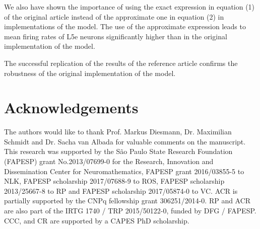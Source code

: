 \documentclass[10pt,a4paper,onecolumn]{article}
\begin{document}
We also have shown the importance of using the exact expression in equation (1) of the original article instead of the approximate one in equation (2) in implementations of the model. The use of the approximate expression leads to mean firing rates of L5e neurons significantly higher than in the original implementation of the model.  

The successful replication of the results of the reference article confirms the robustness of the original implementation of the model. 

\section{Acknowledgements}\label{acknowledgements}
The authors would like to thank Prof. Markus Diesmann, Dr. Maximilian Schmidt and Dr. Sacha van Albada for valuable comments on the manuscript. This research was supported by the S\~{a}o Paulo State Research Foundation (FAPESP) grant No.2013/07699-0 for the Research, Innovation and Dissemination Center for Neuromathematics, FAPESP grant 2016/03855-5 to NLK, FAPESP scholarship 2017/07688-9 to ROS, FAPESP scholarship 2013/25667-8 to RP and FAPESP scholarship 2017/05874-0 to VC. ACR is partially supported by the CNPq fellowship grant 306251/2014-0. RP and ACR are also part of the IRTG 1740 / TRP 2015/50122-0, funded by DFG / FAPESP. CCC, and CR are supported by a CAPES PhD scholarship. 

{\sffamily \small
   \printbibliography[title=References]
}
\end{document}

